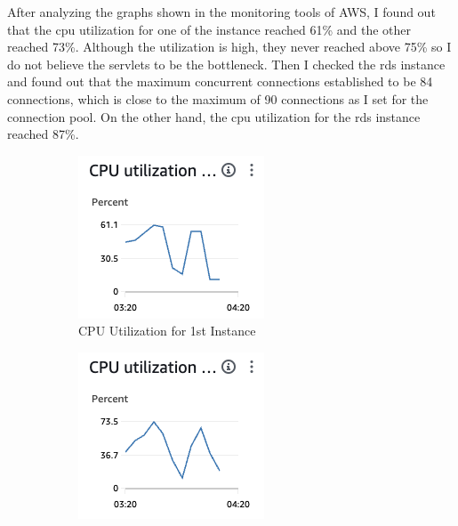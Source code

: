 \documentclass[a4paper,12pt]{article} %
\begin{document}
\begin{enumerate}
After analyzing the graphs shown in the monitoring tools of AWS, I found out that the cpu utilization
for one of the instance reached 61\% and the other reached 73\%. Although the utilization is high, 
they never reached above 75\% so I do not believe the servlets to be the bottleneck. Then I checked the
rds instance and found out that the maximum concurrent connections established to be 84 connections, which
is close to the maximum of 90 connections as I set for the connection pool. On the other hand, the cpu utilization
for the rds instance reached 87\%.

\begin{figure}[H]
    \begin{subfigure}{.475\linewidth}
        \includegraphics[width=\linewidth]{images/instance1_util.png}
        \caption{CPU Utilization for 1st Instance}
        \label{MLEDdet}
    \end{subfigure}\hfill %
    \begin{subfigure}{.475\linewidth}
        \includegraphics[width=\linewidth]{images/instance2_util.png}

\end{subfigure}
\end{figure}
\end{enumerate}
\end{document}
